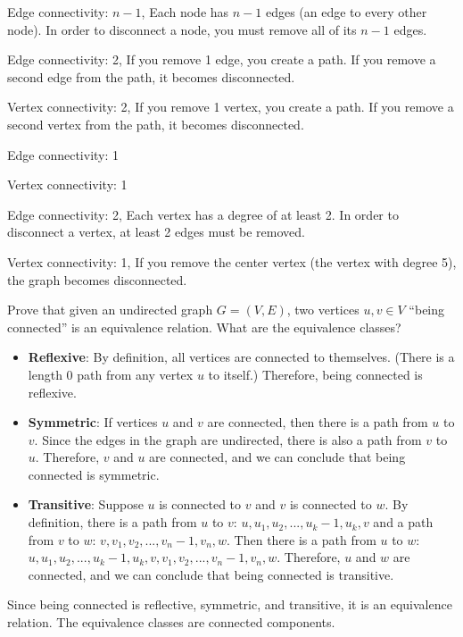 \documentclass[solution, letterpaper]{cs20inclass}
\begin{document}
\begin{solution}
  \subsolution Edge connectivity: $n-1$, Each node has $n-1$ edges (an edge to every other node). In order to disconnect a node, you must remove all of its $n-1$ edges.

  \subsolution Edge connectivity: 2, If you remove 1 edge, you create a path. If you remove a second edge from the path, it becomes disconnected.

\noindent Vertex connectivity: 2, If you remove 1 vertex, you create a path. If you remove a second vertex from the path, it becomes disconnected.

  \subsolution Edge connectivity: 1

\noindent Vertex connectivity: 1

  \subsolution Edge connectivity: 2, Each vertex has a degree of at least 2. In order to disconnect a vertex, at least 2 edges must be removed.

\noindent Vertex connectivity: 1, If you remove the center vertex (the vertex with degree 5), the graph becomes disconnected.

\end{solution}

\problem
Prove that given an undirected graph $G=(V,E)$, two vertices $u, v \in V$ ``being connected'' is an equivalence relation. What are the equivalence classes?

\begin{solution}
\begin{itemize}

  \item \textbf{Reflexive}: By definition, all vertices are connected to themselves. (There is a length 0 path from any vertex $u$ to itself.) Therefore, being connected is reflexive.

  \item \textbf{Symmetric}: If vertices $u$ and $v$ are connected, then there is a path from $u$ to $v$. Since the edges in the graph are undirected, there is also a path from $v$ to $u$. Therefore, $v$ and $u$ are connected, and we can conclude that being connected is symmetric.

  \item \textbf{Transitive}: Suppose $u$ is connected to $v$ and $v$ is connected to $w$. By definition, there is a path from $u$ to $v$: $u, u_1, u_2,..., u_k-1, u_k, v$ and a path from $v$ to $w$: $v, v_1, v_2, ..., v_n-1, v_n, w$. Then there is a path from $u$ to $w$: $u, u_1, u_2,..., u_k-1, u_k, v, v_1, v_2, ..., v_n-1, v_n, w$. Therefore, $u$ and $w$ are connected, and we can conclude that being connected is transitive.

\end{itemize}

\noindent Since being connected is reflective, symmetric, and transitive, it is an equivalence relation. The equivalence classes are connected components.

\end{solution}
\end{document}
